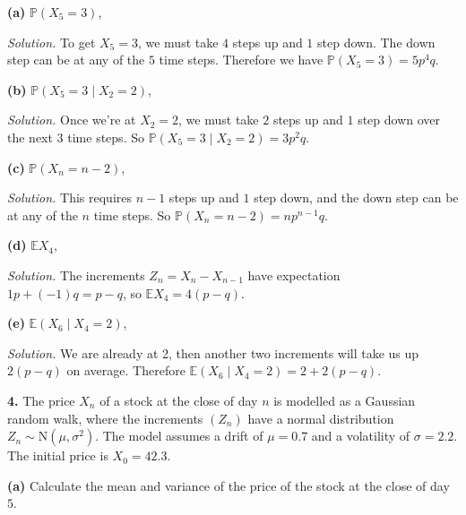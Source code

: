 \documentclass[
  a4paper,
]{article}
\theoremstyle{definition}
\theoremstyle{definition}
\theoremstyle{definition}
\theoremstyle{remark}
\begin{document}
\textbf{(a)} \(\mathbb P(X_5 = 3)\),

\begin{myanswers}
\emph{Solution.} To get \(X_5 = 3\), we must take \(4\) steps up and \(1\) step down. The down step can be at any of the \(5\) time steps. Therefore we have \(\mathbb P(X_5 = 3) = 5p^4q\).

\end{myanswers}

\textbf{(b)} \(\mathbb P(X_5 = 3 \mid X_2 = 2)\),

\begin{myanswers}
\emph{Solution.} Once we're at \(X_2 = 2\), we must take \(2\) steps up and \(1\) step down over the next \(3\) time steps. So \(\mathbb P(X_5 = 3 \mid X_2 = 2) = 3p^2q\).

\end{myanswers}

\textbf{(c)} \(\mathbb P(X_n = n-2)\),

\begin{myanswers}
\emph{Solution.} This requires \(n-1\) steps up and \(1\) step down, and the down step can be at any of the \(n\) time steps. So \(\mathbb P(X_n = n-2) = np^{n-1}q\).

\end{myanswers}

\textbf{(d)} \(\mathbb E X_4\),

\begin{myanswers}
\emph{Solution.} The increments \(Z_n = X_n - X_{n-1}\) have expectation \(1p + (-1)q = p - q\), so \(\mathbb E X_4 = 4(p-q)\).

\end{myanswers}

\textbf{(e)} \(\mathbb E(X_6 \mid X_4 = 2)\),

\begin{myanswers}
\emph{Solution.} We are already at 2, then another two increments will take us up \(2(p-q)\) on average. Therefore \(\mathbb E(X_6 \mid X_4 = 2) = 2 + 2(p-q)\).

\end{myanswers}

\textbf{4.} The price \(X_n\) of a stock at the close of day \(n\) is modelled as a Gaussian random walk, where the increments \((Z_n)\) have a normal distribution \(Z_n \sim \text{N}(\mu, \sigma^2)\). The model assumes a drift of \(\mu = 0.7\) and a volatility of \(\sigma = 2.2\). The initial price is \(X_0 = 42.3\).

\textbf{(a)} Calculate the mean and variance of the price of the stock at the close of day \(5\).
\end{document}
